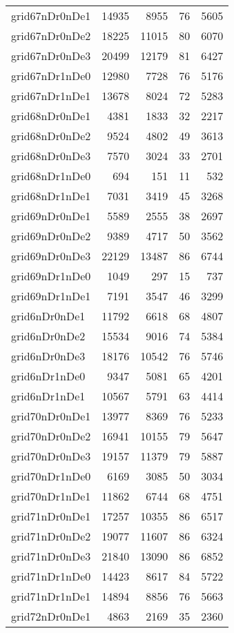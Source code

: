 \begin{longtable}{lrrrr}
grid67nDr0nDe1 & 14935 & 8955 & 76 & 5605 \\
grid67nDr0nDe2 & 18225 & 11015 & 80 & 6070 \\
grid67nDr0nDe3 & 20499 & 12179 & 81 & 6427 \\
grid67nDr1nDe0 & 12980 & 7728 & 76 & 5176 \\
grid67nDr1nDe1 & 13678 & 8024 & 72 & 5283 \\
grid68nDr0nDe1 & 4381 & 1833 & 32 & 2217 \\
grid68nDr0nDe2 & 9524 & 4802 & 49 & 3613 \\
grid68nDr0nDe3 & 7570 & 3024 & 33 & 2701 \\
grid68nDr1nDe0 & 694 & 151 & 11 & 532 \\
grid68nDr1nDe1 & 7031 & 3419 & 45 & 3268 \\
grid69nDr0nDe1 & 5589 & 2555 & 38 & 2697 \\
grid69nDr0nDe2 & 9389 & 4717 & 50 & 3562 \\
grid69nDr0nDe3 & 22129 & 13487 & 86 & 6744 \\
grid69nDr1nDe0 & 1049 & 297 & 15 & 737 \\
grid69nDr1nDe1 & 7191 & 3547 & 46 & 3299 \\
grid6nDr0nDe1 & 11792 & 6618 & 68 & 4807 \\
grid6nDr0nDe2 & 15534 & 9016 & 74 & 5384 \\
grid6nDr0nDe3 & 18176 & 10542 & 76 & 5746 \\
grid6nDr1nDe0 & 9347 & 5081 & 65 & 4201 \\
grid6nDr1nDe1 & 10567 & 5791 & 63 & 4414 \\
grid70nDr0nDe1 & 13977 & 8369 & 76 & 5233 \\
grid70nDr0nDe2 & 16941 & 10155 & 79 & 5647 \\
grid70nDr0nDe3 & 19157 & 11379 & 79 & 5887 \\
grid70nDr1nDe0 & 6169 & 3085 & 50 & 3034 \\
grid70nDr1nDe1 & 11862 & 6744 & 68 & 4751 \\
grid71nDr0nDe1 & 17257 & 10355 & 86 & 6517 \\
grid71nDr0nDe2 & 19077 & 11607 & 86 & 6324 \\
grid71nDr0nDe3 & 21840 & 13090 & 86 & 6852 \\
grid71nDr1nDe0 & 14423 & 8617 & 84 & 5722 \\
grid71nDr1nDe1 & 14894 & 8856 & 76 & 5663 \\
grid72nDr0nDe1 & 4863 & 2169 & 35 & 2360 \\

\end{longtable}
